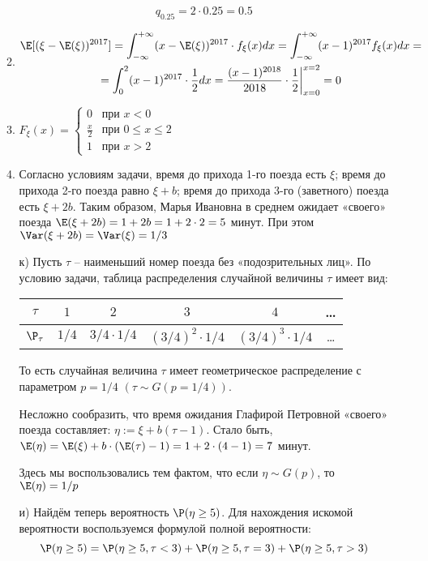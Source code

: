 \begin{enumerate}
\begin{enumerate}
\[\]
\[
q_{0.25} = 2 \cdot 0.25 = 0.5
\]
\item
\begin{multline*}
\E [ (\xi - \E(\xi))^{2017} ] = \int_{-\infty}^{+\infty} (x- \E(\xi) )^{2017} \cdot f_{\xi} (x) dx = \int_{-\infty}^{+\infty} (x-1)^{2017} f_{\xi} (x) dx = \\
= \int_{0}^{2} (x-1)^{2017} \cdot \frac{1}{2} dx = \frac{(x-1)^{2018}}{2018} \cdot \frac{1}{2} \bigg\rvert_{x=0}^{x=2} =0
\end{multline*}
\item $F_{\xi} (x) =
\begin{cases}
0 & \text{при } x < 0 \\
\frac{x}{2} & \text{при } 0 \leq x \leq 2 \\
1 & \text{при } x > 2
\end{cases}
$
\item Согласно условиям задачи, время до прихода 1-го поезда есть $\xi$; время до прихода 2-го поезда равно $\xi + b$; время до прихода 3-го (заветного) поезда есть $\xi + 2b$. Таким образом, Марья Ивановна в среднем ожидает «своего» поезда $\E (\xi + 2b) = 1 + 2b = 1 + 2 \cdot 2 = 5 $ минут. При этом $\Var (\xi + 2b) = \Var (\xi) = 1/3$
\item[к)] Пусть $\tau$ – наименьший номер поезда без «подозрительных лиц». По условию задачи, таблица распределения случайной величины $\tau$ имеет вид:

\begin{tabular}{cccccc}
\toprule
$\tau$ & $ 1 $ & $2$ & $3$ & $4$ & \ldots \\ \midrule
$\P_{\tau}$ & $1/4$ & $3/4\cdot1/4$ & $(3/4)^2 \cdot 1/4$ & $(3/4)^3 \cdot 1/4$ & \ldots\\ \bottomrule
\end{tabular}

То есть случайная величина $\tau$ имеет геометрическое распределение с параметром $p=1/4$ $(\tau \sim G(p=1/4))$.

Несложно сообразить, что время ожидания Глафирой Петровной «своего» поезда составляет: $\eta := \xi + b(\tau- 1)$. Стало быть, $\E (\eta) = \E (\xi) + b \cdot (\E(\tau)-1)  = 1 + 2 \cdot (4-1) = 7$ минут.

Здесь мы воспользовались тем фактом, что если $\eta \sim G(p)$, то $\E (\eta) = 1/p$
\item[и)] Найдём теперь вероятность $\P (\eta \geq 5 )$. Для нахождения искомой вероятности воспользуемся формулой полной вероятности:
\[
	\P (\eta \geq 5 ) = \P(\eta \geq 5, \tau < 3) +\P(\eta \geq 5, \tau = 3)+\P(\eta \geq 5, \tau > 3)
\]


\end{enumerate}
\end{enumerate}

